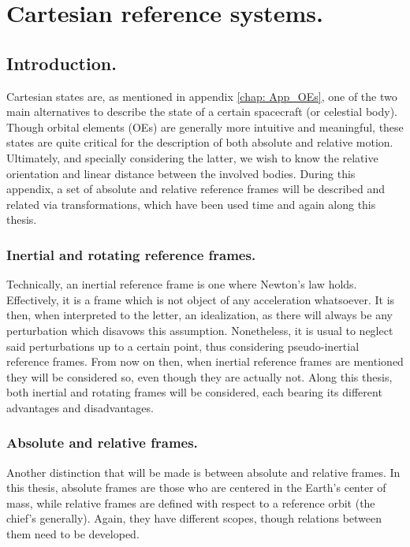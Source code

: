 \chapter{Cartesian reference systems.}
%
\label{chap: App_cartesian}
%
\section{Introduction.}
%
\indent Cartesian states are, as mentioned in appendix \ref{chap: App_OEs}, one of the two main alternatives to describe the state of a certain spacecraft (or celestial body). Though orbital elements (OEs) are generally more intuitive and meaningful, these states are quite critical for the description of both absolute and relative motion. Ultimately, and specially considering the latter, we wish to know the relative orientation and linear distance between the involved bodies. During this appendix, a set of absolute and relative reference frames will be described and related via transformations, which have been used time and again along this thesis.
%
	\subsection{Inertial and rotating reference frames.}
	\indent Technically, an inertial reference frame is one where Newton's law holds. Effectively, it is a frame which is not object of any acceleration whatsoever. It is then, when interpreted to the letter, an idealization, as there will always be any perturbation which disavows this assumption. Nonetheless, it is usual to neglect said perturbations up to a certain point, thus considering pseudo-inertial reference frames. From now on then, when inertial reference frames are mentioned they will be considered so, even though they are actually not. Along this thesis, both inertial and rotating frames will be considered, each bearing its different advantages and disadvantages.
	\subsection{Absolute and relative frames.}
	\indent Another distinction that will be made is between absolute and relative frames. In this thesis, absolute frames are those who are centered in the Earth's center of mass, while relative frames are defined with respect to a reference orbit (the chief's generally). Again, they have different scopes, though relations between them need to be developed.
